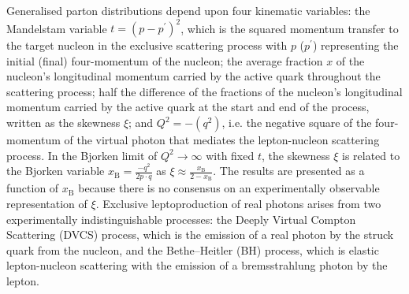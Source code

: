 Generalised parton distributions depend upon four kinematic variables: the
Mandelstam variable $t=(p-p^{\prime})^2$, which is the squared momentum
transfer to the target nucleon in the exclusive scattering process with $p$ ($p^{\prime}$)
representing the initial (final) four-momentum of the nucleon; the average
fraction $x$ of the nucleon's longitudinal momentum carried by the active
quark throughout the scattering process; half the difference of
  the fractions of the nucleon's longitudinal momentum carried
by the active quark at the start and end of the process, written as
the skewness $\xi$; and $Q^2=-(q^2)$, i.e. the negative square of the four-momentum of
the virtual photon that mediates the lepton-nucleon scattering
process. In the Bjorken limit of $Q^2\rightarrow\infty$ with fixed
$t$, the skewness $\xi$ is related to the Bjorken variable
$x_{\textrm{B}}=\frac{-q^2}{2p\cdot q}$ as
$\xi\approx\frac{x_\textrm{B}}{2-x_\textrm{B}}$. The results are presented
as a function of $x_{\textrm{B}}$ because there is no consensus on an experimentally observable representation of $\xi$. 
Exclusive leptoproduction of real photons
 arises from
two experimentally indistinguishable processes: the Deeply Virtual Compton Scattering (DVCS) process,
which is the emission of a real photon by the struck quark from the nucleon, and the Bethe--Heitler (BH) process, which is elastic lepton-nucleon scattering with the emission of a bremsstrahlung photon by the lepton.
